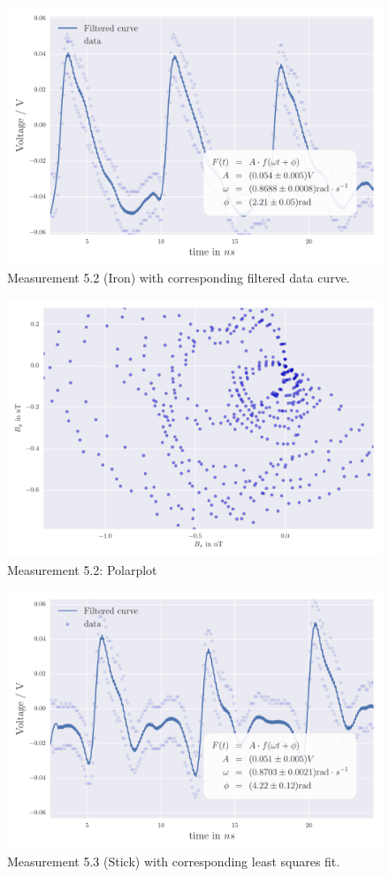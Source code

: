 \begin{figure}[H]
    \centering
    \includegraphics[width=0.7\linewidth]{analysis/figures/fit5_2}
    \caption{Measurement 5.2 (Iron) with corresponding filtered data curve.}
    \label{fig:5_2_plot}
\end{figure}
\begin{figure}[H]
    \centering
    \includegraphics[width=0.7\linewidth]{analysis/figures/polar5_2}
    \caption{Measurement 5.2: Polarplot}
    \label{fig:5_2_polar}
\end{figure}


\begin{figure}[H]
    \centering
    \includegraphics[width=0.7\linewidth]{analysis/figures/fit5_3}
    \caption{Measurement 5.3 (Stick) with corresponding least squares fit.}
    \label{fig:5_3_plot}
\end{figure}

